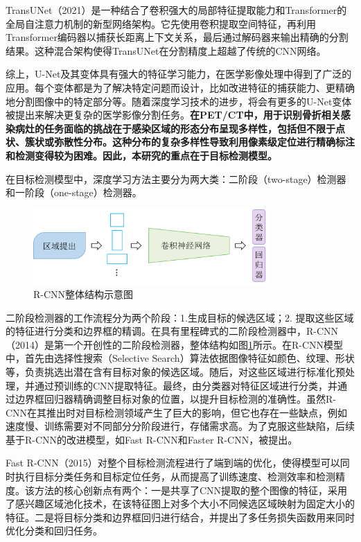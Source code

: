 TransUNet\cite{chen2021transunet}（2021）是一种结合了卷积强大的局部特征提取能力和Transformer的全局自注意力机制的新型网络架构。它先使用卷积提取空间特征，再利用Transformer编码器以捕获长距离上下文关系，最后通过解码器来输出精确的分割结果。这种混合架构使得TransUNet在分割精度上超越了传统的CNN网络。

综上，U-Net及其变体具有强大的特征学习能力，在医学影像处理中得到了广泛的应用。每个变体都是为了解决特定问题而设计，比如改进特征的捕获能力、更精确地分割图像中的特定部分等。随着深度学习技术的进步，将会有更多的U-Net变体被提出来解决更复杂的医学影像分割任务。\textbf{在PET/CT中，用于识别骨折相关感染病灶的任务面临的挑战在于感染区域的形态分布呈现多样性，包括但不限于点状、簇状或弥散性分布。这种分布的复杂多样性导致利用像素级定位进行精确标注和检测变得较为困难。因此，本研究的重点在于目标检测模型。}

在目标检测模型中，深度学习方法主要分为两大类：二阶段（two-stage）检测器和一阶段（one-stage）检测器。

\begin{figure}[htbp]
    \centering
    \includegraphics[width=0.8\textwidth]{figures/chap02_rcnn.png}
    \caption{R-CNN整体结构示意图}
    \label{fig:chap02_rcnn}
\end{figure}

二阶段检测器的工作流程分为两个阶段：1.生成目标的候选区域；2. 提取这些区域的特征进行分类和边界框的精调。在具有里程碑式的二阶段检测器中，R-CNN\cite{girshick2014rich}（2014）是第一个开创性的二阶段检测器，整体结构如图\ref{fig:chap02_rcnn}所示。在R-CNN模型中，首先由选择性搜索（Selective Search）算法依据图像特征如颜色、纹理、形状等，负责挑选出潜在含有目标对象的候选区域。随后，对这些区域进行标准化预处理，并通过预训练的CNN提取特征。最终，由分类器对特征区域进行分类，并通过边界框回归器精确调整目标对象的位置，以提升目标检测的准确性。虽然R-CNN在其推出时对目标检测领域产生了巨大的影响，但它也存在一些缺点，例如速度慢、训练需要对不同部分分阶段进行，存储需求高。为了克服这些缺陷，后续基于R-CNN的改进模型，如Fast R-CNN\cite{girshick2015fast}和Faster R-CNN\cite{ren2015faster}，被提出。

Fast R-CNN\cite{girshick2015fast}（2015）对整个目标检测流程进行了端到端的优化，使得模型可以同时执行目标分类任务和目标定位任务，从而提高了训练速度、检测效率和检测精度。该方法的核心创新点有两个：一是共享了CNN提取的整个图像的特征，采用了感兴趣区域池化技术，在该特征图上对多个大小不同候选区域映射为固定大小的特征。二是将目标分类和边界框回归进行结合，并提出了多任务损失函数用来同时优化分类和回归任务。

